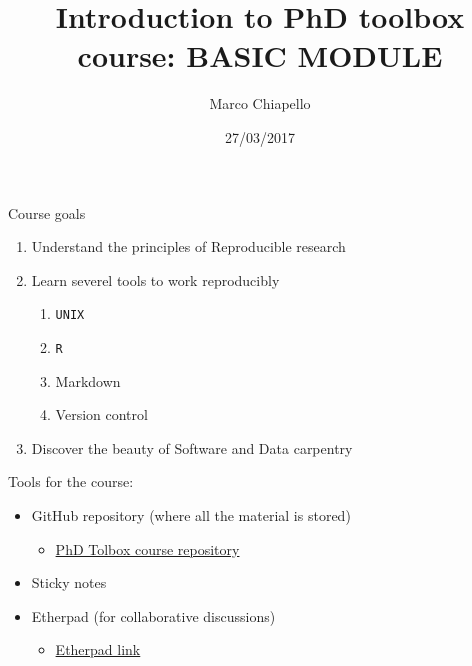 \documentclass{beamer}
\title[Short title]{Introduction to PhD toolbox course: BASIC MODULE}
\author{Marco Chiapello}
\institute[Center for Proteomics]{
Center for Proteomics\\
University of Cambridge \\ 
\medskip
\textit{mc983@cam.ac.uk} 
}
\date{27/03/2017}
\begin{document}
\begin{frame}
\titlepage 
\end{frame}

\begin{frame}
	{\huge Course goals}
	\begin{enumerate}
		\item Understand the principles of Reproducible research
\pause
		\item Learn severel tools to work reproducibly
			\begin{enumerate}
				\item \texttt{UNIX}
				\item \texttt{R}
				\item Markdown
				\item Version control
			\end{enumerate}
\pause
		\item Discover the beauty of Software and Data carpentry
	\end{enumerate}
\end{frame}







\begin{frame}
{\huge Tools for the course:}
	\begin{itemize}
	\item GitHub repository {\tiny (where all the material is stored)}
		\begin{itemize}
			\item \href{https://github.com/mchiapello/2017\_PhD\_Toolbox\_course/}{PhD Tolbox course repository}
		\end{itemize}
\pause
	\item Sticky notes 
\pause
	\item Etherpad {\tiny (for collaborative discussions)}
		\begin{itemize}
			\item \href{https://public.etherpad-mozilla.org/p/PhD\_Toolbox\_2017}{Etherpad link}
		\end{itemize}
	\end{itemize}
\end{frame}
\end{document}
